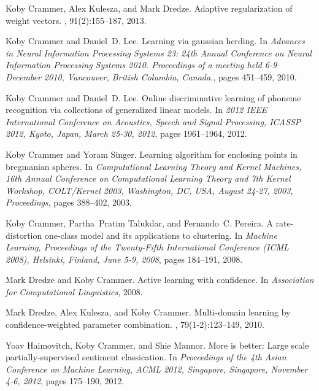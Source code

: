\documentclass[12pt]{article}
\begin{document}
\begin{small}
\begin{thebibliography}{10}
Koby Crammer, Alex Kulesza, and Mark Dredze.
\newblock Adaptive regularization of weight vectors.
, 91(2):155--187, 2013.

Koby Crammer and Daniel~D. Lee.
\newblock Learning via gaussian herding.
\newblock In {\em Advances in Neural Information Processing Systems 23: 24th
	Annual Conference on Neural Information Processing Systems 2010. Proceedings
	of a meeting held 6-9 December 2010, Vancouver, British Columbia, Canada.},
pages 451--459, 2010.

Koby Crammer and Daniel~D. Lee.
\newblock Online discriminative learning of phoneme recognition via collections
of generalized linear models.
\newblock In {\em 2012 {IEEE} International Conference on Acoustics, Speech and
	Signal Processing, {ICASSP} 2012, Kyoto, Japan, March 25-30, 2012}, pages
1961--1964, 2012.

Koby Crammer and Yoram Singer.
\newblock Learning algorithm for enclosing points in bregmanian spheres.
\newblock In {\em Computational Learning Theory and Kernel Machines, 16th
	Annual Conference on Computational Learning Theory and 7th Kernel Workshop,
	COLT/Kernel 2003, Washington, DC, USA, August 24-27, 2003, Proceedings},
pages 388--402, 2003.

Koby Crammer, Partha~Pratim Talukdar, and Fernando~C. Pereira.
\newblock A rate-distortion one-class model and its applications to clustering.
\newblock In {\em Machine Learning, Proceedings of the Twenty-Fifth
	International Conference {(ICML} 2008), Helsinki, Finland, June 5-9, 2008},
pages 184--191, 2008.

Mark Dredze and Koby Crammer.
\newblock Active learning with confidence.
\newblock In {\em Association for Computational Linguistics}, 2008.

Mark Dredze, Alex Kulesza, and Koby Crammer.
\newblock Multi-domain learning by confidence-weighted parameter combination.
, 79(1-2):123--149, 2010.

Yoav Haimovitch, Koby Crammer, and Shie Mannor.
\newblock More is better: Large scale partially-supervised sentiment
classication.
\newblock In {\em Proceedings of the 4th Asian Conference on Machine Learning,
	{ACML} 2012, Singapore, Singapore, November 4-6, 2012}, pages 175--190, 2012.


\end{thebibliography}
\end{small}
\end{document}
